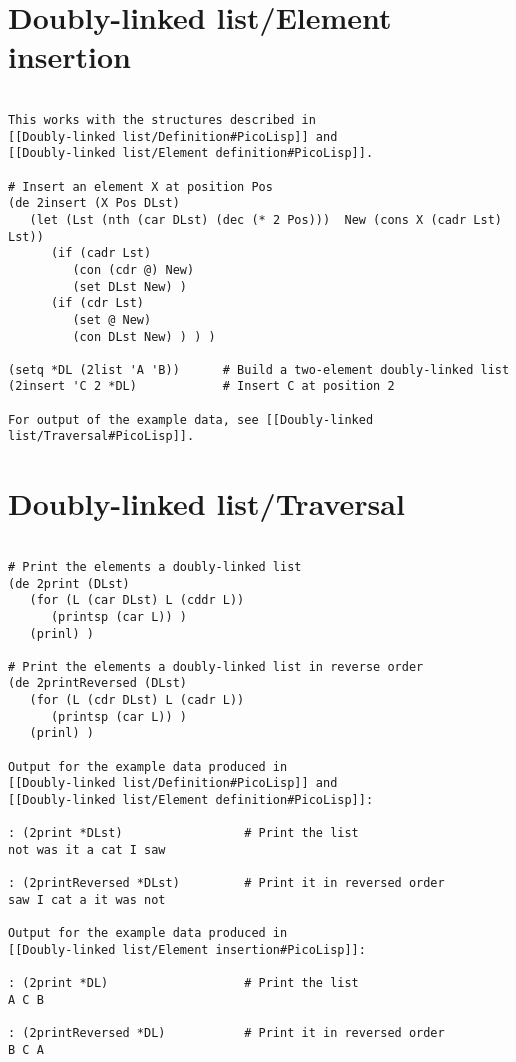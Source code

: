 \section*{Doubly-linked list/Element insertion}

\begin{verbatim}

This works with the structures described in
[[Doubly-linked list/Definition#PicoLisp]] and
[[Doubly-linked list/Element definition#PicoLisp]].

# Insert an element X at position Pos
(de 2insert (X Pos DLst)
   (let (Lst (nth (car DLst) (dec (* 2 Pos)))  New (cons X (cadr Lst) Lst))
      (if (cadr Lst)
         (con (cdr @) New)
         (set DLst New) )
      (if (cdr Lst)
         (set @ New)
         (con DLst New) ) ) )

(setq *DL (2list 'A 'B))      # Build a two-element doubly-linked list
(2insert 'C 2 *DL)            # Insert C at position 2

For output of the example data, see [[Doubly-linked list/Traversal#PicoLisp]].

\end{verbatim}

\section*{Doubly-linked list/Traversal}

\begin{verbatim}

# Print the elements a doubly-linked list
(de 2print (DLst)
   (for (L (car DLst) L (cddr L))
      (printsp (car L)) )
   (prinl) )

# Print the elements a doubly-linked list in reverse order
(de 2printReversed (DLst)
   (for (L (cdr DLst) L (cadr L))
      (printsp (car L)) )
   (prinl) )

Output for the example data produced in
[[Doubly-linked list/Definition#PicoLisp]] and
[[Doubly-linked list/Element definition#PicoLisp]]:

: (2print *DLst)                 # Print the list
not was it a cat I saw

: (2printReversed *DLst)         # Print it in reversed order
saw I cat a it was not

Output for the example data produced in
[[Doubly-linked list/Element insertion#PicoLisp]]:

: (2print *DL)                   # Print the list
A C B

: (2printReversed *DL)           # Print it in reversed order
B C A

\end{verbatim}


